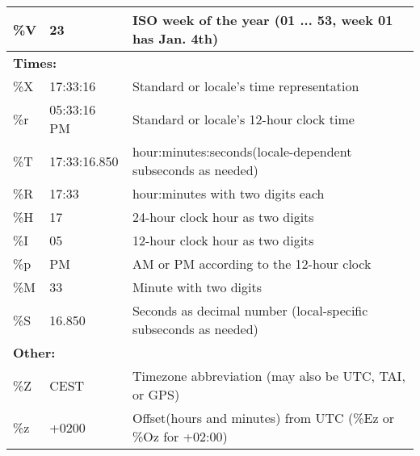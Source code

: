 \begin{itemize}
\begin{longtable}[c]{|lll|}
\multicolumn{1}{|l|}{\%V}            & \multicolumn{1}{l|}{23}                & ISO week of the year (01 ... 53, week 01 has Jan. 4th)          \\ \hline
\multicolumn{3}{|l|}{\textbf{Times:}}                                                                                                           \\ \hline
\multicolumn{1}{|l|}{\%X}            & \multicolumn{1}{l|}{17:33:16}          & Standard or locale's time representation                        \\ \hline
\multicolumn{1}{|l|}{\%r}            & \multicolumn{1}{l|}{05:33:16 PM}       & Standard or locale's 12-hour clock time                         \\ \hline
\multicolumn{1}{|l|}{\%T} & \multicolumn{1}{l|}{17:33:16.850}             & hour:minutes:seconds(locale-dependent subseconds as needed)     \\ \hline
\multicolumn{1}{|l|}{\%R}            & \multicolumn{1}{l|}{17:33}             & hour:minutes with two digits each                               \\ \hline
\multicolumn{1}{|l|}{\%H}            & \multicolumn{1}{l|}{17}                & 24-hour clock hour as two digits                                \\ \hline
\multicolumn{1}{|l|}{\%I}            & \multicolumn{1}{l|}{05}                & 12-hour clock hour as two digits                                \\ \hline
\multicolumn{1}{|l|}{\%p}            & \multicolumn{1}{l|}{PM}                & AM or PM according to the 12-hour clock                         \\ \hline
\multicolumn{1}{|l|}{\%M}            & \multicolumn{1}{l|}{33}                & Minute with two digits                                          \\ \hline
\multicolumn{1}{|l|}{\%S} & \multicolumn{1}{l|}{16.850}                   & Seconds as decimal number (local-specific subseconds as needed) \\ \hline
\multicolumn{3}{|l|}{\textbf{Other:}}                                                                                                           \\ \hline
\multicolumn{1}{|l|}{\%Z}            & \multicolumn{1}{l|}{CEST}              & Timezone abbreviation (may also be UTC, TAI, or GPS)            \\ \hline
\multicolumn{1}{|l|}{\%z}            & \multicolumn{1}{l|}{+0200}             & Offset(hours and minutes) from UTC (\%Ez or \%Oz for +02:00)    \\ \hline

\end{longtable}
\end{itemize}
